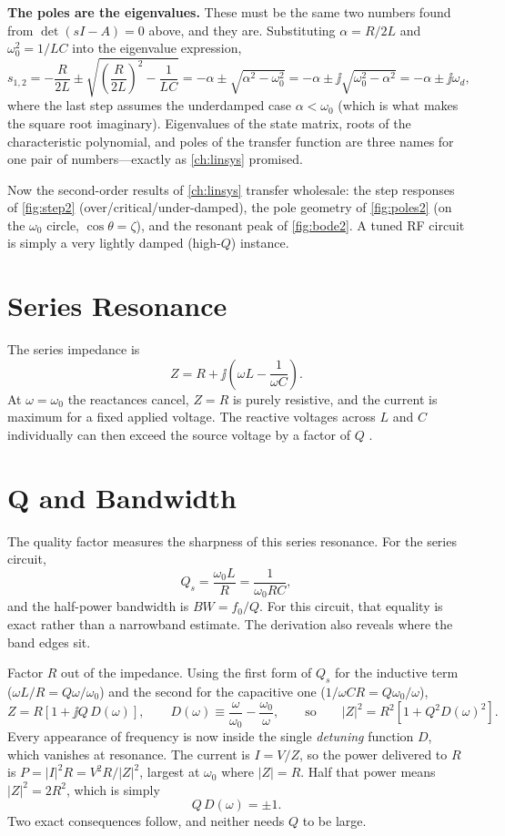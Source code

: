 \begin{controlsbox}
\textbf{The poles are the eigenvalues.} These must be the same two numbers found
from \(\det(sI-A)=0\) above, and they are. Substituting
\(\alpha=R/2L\) and \(\omega_0^2=1/LC\) into the eigenvalue expression,
\[
s_{1,2}=-\frac{R}{2L}\pm\sqrt{\left(\frac{R}{2L}\right)^{2}-\frac{1}{LC}}
=-\alpha\pm\sqrt{\alpha^2-\omega_0^2}
=-\alpha\pm\jj\sqrt{\omega_0^2-\alpha^2}
=-\alpha\pm\jj\omega_d,
\]
where the last step assumes the underdamped case \(\alpha<\omega_0\) (which is what
makes the square root imaginary). Eigenvalues of the state matrix, roots of the
characteristic polynomial, and poles of the transfer function are three names for
one pair of numbers---exactly as \cref{ch:linsys} promised.
\end{controlsbox}
Now the second-order results of \cref{ch:linsys} transfer wholesale: the step
responses of \cref{fig:step2} (over/critical/under-damped), the pole geometry of
\cref{fig:poles2} (on the \(\omega_0\) circle, \(\cos\theta=\zeta\)), and the
resonant peak of \cref{fig:bode2}. A tuned RF circuit is simply a very
lightly damped (high-\(Q\)) instance.

\section{Series Resonance}
The series impedance is
\[
Z=R+\jj\left(\omega L-\frac{1}{\omega C}\right).
\]
At \(\omega=\omega_0\) the reactances cancel, \(Z=R\) is purely resistive, and the
current is maximum for a fixed applied voltage. The reactive voltages across \(L\)
and \(C\) individually can then exceed the source voltage by a factor of \(Q\)
\cite[pp.~59--63]{white2004highfrequency}.

\section{Q and Bandwidth}
\label{sec:halfpower}
The quality factor measures the sharpness of this series resonance. For the series
circuit,
\[
Q_s=\frac{\omega_0 L}{R}=\frac{1}{\omega_0 RC},
\]
and the half-power bandwidth is \(BW=f_0/Q\). For this circuit, that equality is
exact rather than a narrowband estimate. The derivation also reveals where the band
edges sit.

Factor \(R\) out of the impedance. Using the first form of \(Q_s\) for the inductive
term (\(\omega L/R=Q\omega/\omega_0\)) and the second for the capacitive one
(\(1/\omega CR=Q\omega_0/\omega\)),
\[
Z=R\left[1+\jj Q\,D(\omega)\right],
\qquad
D(\omega)\equiv\frac{\omega}{\omega_0}-\frac{\omega_0}{\omega},
\qquad\text{so}\qquad
|Z|^2=R^2\left[1+Q^2D(\omega)^2\right].
\]
Every appearance of frequency is now inside the single \emph{detuning} function
\(D\), which vanishes at resonance. The current is \(I=V/Z\), so the power delivered
to \(R\) is \(P=|I|^2R=V^2R/|Z|^2\), largest at \(\omega_0\) where \(|Z|=R\). Half
that power means \(|Z|^2=2R^2\), which is simply
\[
Q\,D(\omega)=\pm1 .
\]
Two exact consequences follow, and neither needs \(Q\) to be large.

